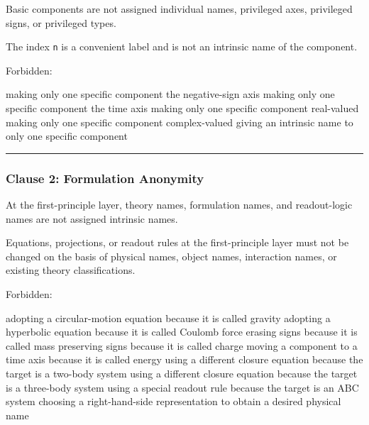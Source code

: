 \documentclass[
  a4paper,
]{article}
\newenvironment{Shaded}{}{}
\newcommand{\NormalTok}[1]{#1}
\begin{document}
Basic components are not assigned individual names, privileged axes,
privileged signs, or privileged types.

The index \texttt{n} is a convenient label and is not an intrinsic name
of the component.

Forbidden:

\begin{Shaded}
\begin{Highlighting}[]
\NormalTok{making only one specific component the negative{-}sign axis}
\NormalTok{making only one specific component the time axis}
\NormalTok{making only one specific component real{-}valued}
\NormalTok{making only one specific component complex{-}valued}
\NormalTok{giving an intrinsic name to only one specific component}
\end{Highlighting}
\end{Shaded}

\begin{center}\rule{0.5\linewidth}{0.5pt}\end{center}

\subsubsection{Clause 2: Formulation
Anonymity}\label{clause-2-formulation-anonymity}

At the first-principle layer, theory names, formulation names, and
readout-logic names are not assigned intrinsic names.

Equations, projections, or readout rules at the first-principle layer
must not be changed on the basis of physical names, object names,
interaction names, or existing theory classifications.

Forbidden:

\begin{Shaded}
\begin{Highlighting}[]
\NormalTok{adopting a circular{-}motion equation because it is called gravity}
\NormalTok{adopting a hyperbolic equation because it is called Coulomb force}
\NormalTok{erasing signs because it is called mass}
\NormalTok{preserving signs because it is called charge}
\NormalTok{moving a component to a time axis because it is called energy}
\NormalTok{using a different closure equation because the target is a two{-}body system}
\NormalTok{using a different closure equation because the target is a three{-}body system}
\NormalTok{using a special readout rule because the target is an ABC system}
\NormalTok{choosing a right{-}hand{-}side representation to obtain a desired physical name}
\end{Highlighting}
\end{Shaded}
\end{document}
